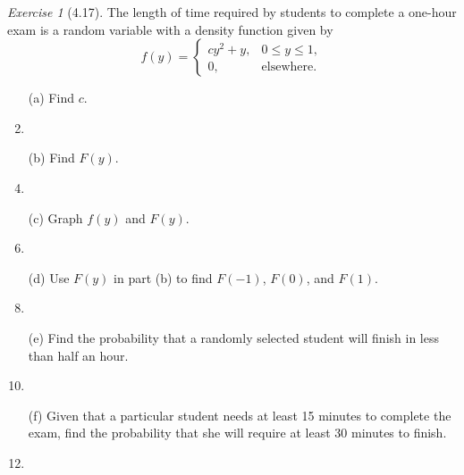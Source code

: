 \documentclass[12pt]{amsart}
\makeatletter
\theoremstyle{remark}
\newtheorem*{exercise}{Exercise}%
\renewenvironment{proof}[1][\proofname]{\par\doublespacing
  \pushQED{\qed}%
  \normalfont \topsep6\p@\@plus6\p@\relax
  \list{}{%
    \settowidth{\leftmargin}{\itshape\proofname:\hskip\labelsep}%
    \setlength{\labelwidth}{0pt}%
    \setlength{\itemindent}{-\leftmargin}%
  }%
  \item[\hskip\labelsep\itshape#1\@addpunct{:}]\ignorespaces
}{%
  \popQED\endlist\@endpefalse
  \singlespacing
}
\theoremstyle{mycomment}
\makeatother
\begin{document}
\begin{exercise}[4.17]
The length of time required by students to complete a one-hour exam is a random variable with a density function given by
$$f(y) = \begin{cases}
cy^2 + y, & 0 \leq y \leq 1, \\
0, & \text{elsewhere}.
\end{cases}$$

\begin{enumerate}
    \item[(a)] Find $c$.
\begin{proof}[Solution]
 
\end{proof}
    \item[(b)] Find $F(y)$.
\begin{proof}[Solution]
 
\end{proof}
    \item[(c)] Graph $f(y)$ and $F(y)$.
\begin{proof}[Solution]
 
\end{proof}
    \item[(d)] Use $F(y)$ in part (b) to find $F(-1)$, $F(0)$, and $F(1)$.
\begin{proof}[Solution]
 
\end{proof}
    \item[(e)] Find the probability that a randomly selected student will finish in less than half an hour.
\begin{proof}[Solution]
 
\end{proof}
    \item[(f)] Given that a particular student needs at least 15 minutes to complete the exam, find the probability that she will require at least 30 minutes to finish.
\begin{proof}[Solution]
 
\end{proof}
\end{enumerate} 
\end{exercise}
\end{document}

